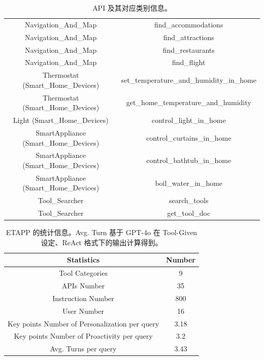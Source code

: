 \documentclass[11pt]{article}
\begin{document}
\begin{table}
{{\begin{tabular}{c|c}
Navigation\_And\_Map & find\_accommodations \\
Navigation\_And\_Map & find\_attractions \\
Navigation\_And\_Map & find\_restaurants \\
Navigation\_And\_Map & find\_flight \\
Thermostat (Smart\_Home\_Devices) & set\_temperature\_and\_humidity\_in\_home \\
Thermostat (Smart\_Home\_Devices) & get\_home\_temperature\_and\_humidity \\
Light (Smart\_Home\_Devices) & control\_light\_in\_home \\
SmartAppliance (Smart\_Home\_Devices) & control\_curtains\_in\_home \\
SmartAppliance (Smart\_Home\_Devices) & control\_bathtub\_in\_home \\
SmartAppliance (Smart\_Home\_Devices) & boil\_water\_in\_home \\
\midrule
Tool\_Searcher & search\_tools \\
Tool\_Searcher & get\_tool\_doc \\
\midrule
    \end{tabular}
    }
}
    \caption{API 及其对应类别信息。}
    \label{table:api_name}
\end{table}


\begin{table}[]
    \centering
    \begin{tabular}{c|c}
        \toprule
        Statistics & Number \\
        \toprule
        Tool Categories & 9 \\
        APIs Number & 35 \\
        Instruction Number & 800 \\
        User Number & 16 \\
        Key points Number of Personalization per query & 3.18 \\
        Key points Number of Proactivity per query & 3.2 \\
        Avg. Turns per query  & 3.43 \\
        \midrule
    \end{tabular}
    \caption{ETAPP 的统计信息。Avg. Turn 基于 GPT-4o 在 Tool-Given 设定、ReAct 格式下的输出计算得到。}
    \label{table:statistics}
\end{table}
\end{document}
